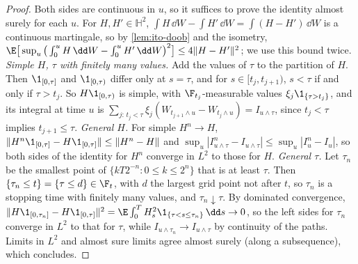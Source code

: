 \begin{proof}
Both sides are continuous in $u$, so it suffices to prove the identity almost surely for each
$u$. For $H,H'\in\mathbb H^2$, $\int H\,\dd W-\int H'\,\dd W=\int(H-H')\,\dd W$ is a continuous
martingale, so by \cref{lem:ito-doob} and the isometry,
$\E\big[\sup_u\big(\int_0^uH\,\dd W-\int_0^uH'\,\dd W\big)^2\big]\le4\|H-H'\|^2$; we use this
bound twice. \emph{Simple $H$, $\tau$ with finitely many values.} Add the values of $\tau$ to the
partition of $H$. Then $\1_{[0,\tau]}$ and $\1_{[0,\tau)}$ differ only at $s=\tau$, and for
$s\in[t_j,t_{j+1})$, $s<\tau$ if and only if $\tau>t_j$. So $H\1_{[0,\tau)}$ is simple, with
$\F_{t_j}$-measurable values $\xi_j\1_{\{\tau>t_j\}}$, and its integral at time $u$ is
$\sum_{j:\,t_j<\tau}\xi_j(W_{t_{j+1}\wedge u}-W_{t_j\wedge u})=I_{u\wedge\tau}$, since $t_j<\tau$
implies $t_{j+1}\le\tau$. \emph{General $H$.} For simple $H^n\to H$,
$\|H^n\1_{[0,\tau]}-H\1_{[0,\tau]}\|\le\|H^n-H\|$ and
$\sup_u|I^n_{u\wedge\tau}-I_{u\wedge\tau}|\le\sup_u|I^n_u-I_u|$, so both sides of the identity
for $H^n$ converge in $L^2$ to those for $H$. \emph{General $\tau$.} Let $\tau_n$ be the smallest
point of $\{kT2^{-n}:0\le k\le2^n\}$ that is at least $\tau$. Then $\{\tau_n\le t\}=\{\tau\le
d\}\in\F_t$, with $d$ the largest grid point not after $t$, so $\tau_n$ is a stopping time with
finitely many values, and $\tau_n\downarrow\tau$. By dominated convergence,
$\|H\1_{[0,\tau_n]}-H\1_{[0,\tau]}\|^2=\E\int_0^TH_s^2\1_{\{\tau<s\le\tau_n\}}\,\dd s\to0$, so the
left sides for $\tau_n$ converge in $L^2$ to that for $\tau$, while
$I_{u\wedge\tau_n}\to I_{u\wedge\tau}$ by continuity of the paths. Limits in $L^2$ and almost
sure limits agree almost surely (along a subsequence), which concludes.
\end{proof}

